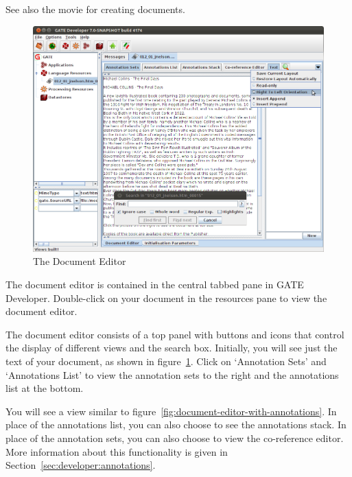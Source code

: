 See also the 
{movie for creating documents}.


\begin{figure}[!htb]
\begin{center}
\includegraphics[width=14cm]{document-editor.png}
\end{center}
\caption{The Document Editor}
\label{fig:document-editor}
\end{figure}

The document editor is contained in the central tabbed pane in GATE Developer.
Double-click on your document in the resources pane to view the document editor.

The document editor consists of a top panel with buttons and icons that control
the display of different views and the search box. Initially, you will see just
the text of your document, as shown in figure~\ref{fig:document-editor}. Click on
`Annotation Sets' and `Annotations List' to view the annotation sets to the right
and the annotations list at the bottom.

You will see a view similar to
figure~\ref{fig:document-editor-with-annotations}. In place of the
annotations list, you can also choose to see the annotations stack. In place
of the annotation sets, you can also choose to view the co-reference
editor. More information about this functionality is given in
Section~\ref{sec:developer:annotations}.

